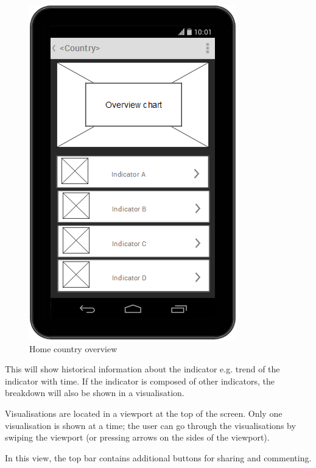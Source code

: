 \documentclass[12pt,a4paper,twoside]{article}
\begin{document}
\begin{figure}[H]
\centering
\includegraphics[scale=0.4]{mocks/overview.png}
\caption{Home country overview}
\end{figure}

This will show historical information about the indicator e.g. trend of the indicator with time. If the indicator is composed of other indicators, the breakdown will also be shown in a visualisation.

Visualisations are located in a viewport at the top of the screen. Only one visualisation is shown at a time; the user can go through the visualisations by swiping the viewport (or pressing arrows on the sides of the viewport).

In this view, the top bar contains additional buttons for sharing and commenting.
\end{document}
